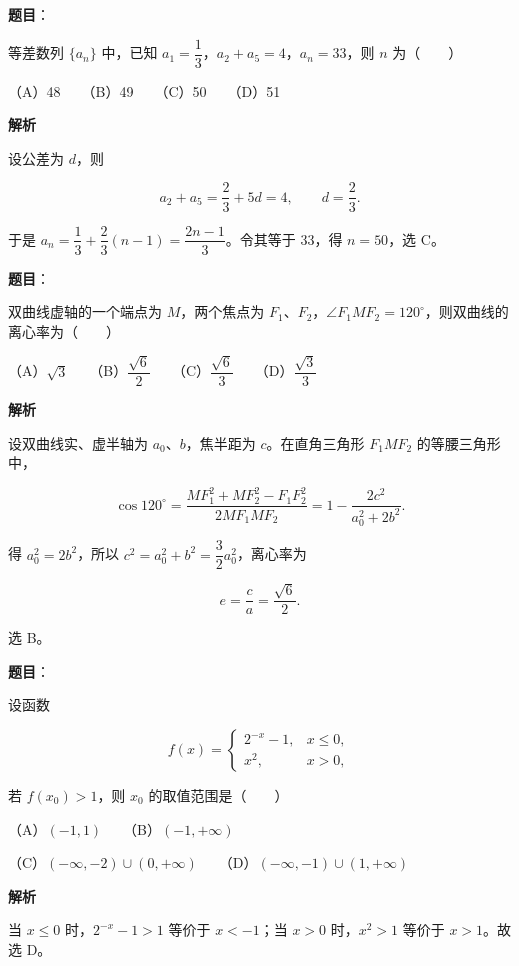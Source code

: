 \begin{answer}

\textbf{题目}：

等差数列 $\{a_n\}$ 中，已知 $a_1=\dfrac13$，$a_2+a_5=4$，$a_n=33$，则 $n$ 为\mbox{（　　）}

（A）48　　（B）49　　（C）50　　（D）51

\textbf{解析}

设公差为 $d$，则

\nopagebreak[4]
\[
a_2+a_5=\frac23+5d=4,\qquad d=\frac23.
\]

于是 $a_n=\dfrac13+\dfrac23(n-1)=\dfrac{2n-1}{3}$。令其等于 $33$，得 $n=50$，选 C。


\end{answer}
\begin{answer}

\textbf{题目}：

双曲线虚轴的一个端点为 $M$，两个焦点为 $F_1\text{、}F_2$，$\angle F_1MF_2=120^\circ$，则双曲线的离心率为\mbox{（　　）}

（A）$\sqrt3$　　（B）$\dfrac{\sqrt6}{2}$　　（C）$\dfrac{\sqrt6}{3}$　　（D）$\dfrac{\sqrt3}{3}$

\textbf{解析}

设双曲线实、虚半轴为 $a_0\text{、}b$，焦半距为 $c$。在直角三角形 $F_1MF_2$ 的等腰三角形中，

\nopagebreak[4]
\[
\cos120^\circ
=\frac{MF_1^2+MF_2^2-F_1F_2^2}{2MF_1MF_2}
=1-\frac{2c^2}{a_0^2+2b^2}.
\]

得 $a_0^2=2b^2$，所以 $c^2=a_0^2+b^2=\dfrac32a_0^2$，离心率为

\nopagebreak[4]
\[
e=\frac ca=\frac{\sqrt6}{2}.
\]

选 B。


\end{answer}
\begin{answer}

\textbf{题目}：

设函数

\nopagebreak[4]
\[
f(x)=
\begin{cases}
2^{-x}-1,&x\leqslant0,\\
x^2,&x>0,
\end{cases}
\]

若 $f(x_0)>1$，则 $x_0$ 的取值范围是\mbox{（　　）}

（A）$(-1,1)$　　（B）$(-1,+\infty)$

（C）$(-\infty,-2)\cup(0,+\infty)$　　（D）$(-\infty,-1)\cup(1,+\infty)$

\textbf{解析}

当 $x\leqslant0$ 时，$2^{-x}-1>1$ 等价于 $x<-1$；当 $x>0$ 时，$x^2>1$ 等价于 $x>1$。故选 D。


\end{answer}
